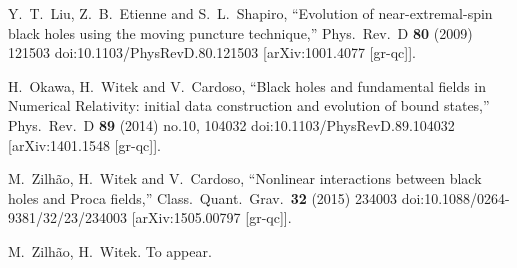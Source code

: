 \begin{thebibliography}{9}

  Y.~T.~Liu, Z.~B.~Etienne and S.~L.~Shapiro,
  ``Evolution of near-extremal-spin black holes using the moving puncture technique,''
  Phys.\ Rev.\ D {\bf 80} (2009) 121503
  doi:10.1103/PhysRevD.80.121503
  [arXiv:1001.4077 [gr-qc]].

  H.~Okawa, H.~Witek and V.~Cardoso,
  ``Black holes and fundamental fields in Numerical Relativity: initial data construction and evolution of bound states,''
  Phys.\ Rev.\ D {\bf 89} (2014) no.10,  104032
  doi:10.1103/PhysRevD.89.104032
  [arXiv:1401.1548 [gr-qc]].

  M.~Zilh\~ao, H.~Witek and V.~Cardoso,
  ``Nonlinear interactions between black holes and Proca fields,''
  Class.\ Quant.\ Grav.\  {\bf 32} (2015) 234003
  doi:10.1088/0264-9381/32/23/234003
  [arXiv:1505.00797 [gr-qc]].

  M.~Zilh\~ao, H.~Witek. To appear.


\end{thebibliography}



